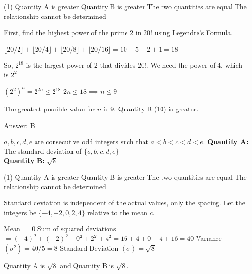\documentclass[11pt,paper=a4,answers]{exam}
\begin{document}
\begin{questions}
\begin{tasks}(1)
\task[A)] Quantity A is greater
\task[B)] Quantity B is greater
\task[C)] The two quantities are equal
\task[D)] The relationship cannot be determined
\end{tasks}

\begin{solution}
First, find the highest power of the prime 2 in $20!$ using Legendre's Formula.
\vspace{5pt}
\begin{center}
$\lfloor 20/2 \rfloor + \lfloor 20/4 \rfloor + \lfloor 20/8 \rfloor + \lfloor 20/16 \rfloor = 10 + 5 + 2 + 1 = 18$
\end{center}
\vspace{5pt}
So, $2^{18}$ is the largest power of 2 that divides $20!$.
\vspace{5pt}
We need the power of $4$, which is $2^2$.
\vspace{5pt}
\begin{center}
$(2^2)^n = 2^{2n} \leq 2^{18}$
\vspace{5pt}
$2n \leq 18 \implies n \leq 9$
\end{center}
\vspace{5pt}
The greatest possible value for $n$ is 9. Quantity B (10) is greater.

Answer: \colorbox{yellow!100}{B}
\end{solution}

\vspace{1cm}

\question
$a, b, c, d, e$ are consecutive odd integers such that $a < b < c < d < e$.
\vspace{5pt}
\textbf{Quantity A: } The standard deviation of $\{a, b, c, d, e\}$ \\
\vspace{5pt}
\textbf{Quantity B: } $\sqrt{8}$

\begin{tasks}(1)
\task[A)] Quantity A is greater
\task[B)] Quantity B is greater
\task[C)] The two quantities are equal
\task[D)] The relationship cannot be determined
\end{tasks}

\begin{solution}
Standard deviation is independent of the actual values, only the spacing. Let the integers be $\{-4, -2, 0, 2, 4\}$ relative to the mean $c$.
\vspace{5pt}
\begin{center}
Mean $= 0$
\vspace{5pt}
Sum of squared deviations $= (-4)^2 + (-2)^2 + 0^2 + 2^2 + 4^2 = 16 + 4 + 0 + 4 + 16 = 40$
\vspace{5pt}
Variance $(\sigma^2) = 40 / 5 = 8$
\vspace{5pt}
Standard Deviation $(\sigma) = \sqrt{8}$
\end{center}
\vspace{5pt}
Quantity A is $\sqrt{8}$ and Quantity B is $\sqrt{8}$.


\end{solution}
\end{questions}
\end{document}
